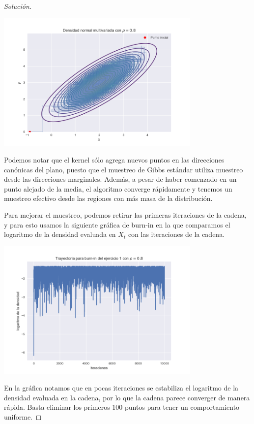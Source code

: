 \documentclass{article}
\begin{document}
\begin{enumerate}
\begin{proof}[Solución]
        \begin{center}
            \includegraphics[width=0.75\textwidth]{Tarea8/traj11.png}
        \end{center}

        Podemos notar que el kernel sólo agrega nuevos puntos en las direcciones canónicas
        del plano, puesto que el muestreo de Gibbs estándar utiliza muestreo desde las 
        direcciones marginales. Además, a pesar de haber comenzado en un punto alejado de 
        la media, el algoritmo converge rápidamente y tenemos un muestreo efectivo desde las
        regiones con más masa de la distribución. 
        
        Para mejorar el muestreo, podemos retirar
        las primeras iteraciones de la cadena, y para esto usamos la siguiente gráfica de 
        burn-in en la que comparamos el logaritmo de la densidad evaluada en $X_t$
        con las iteraciones de la cadena. 

        \begin{center}
            \includegraphics[width=0.75\textwidth]{Tarea8/burnin1.png}
        \end{center}

        En la gráfica notamos que en pocas iteraciones se estabiliza el 
        logaritmo de la densidad evaluada en la cadena, por lo que la cadena parece 
        converger de manera rápida. Basta eliminar los primeros 100 puntos para 
        tener un comportamiento uniforme.


\end{proof}
\end{enumerate}
\end{document}
